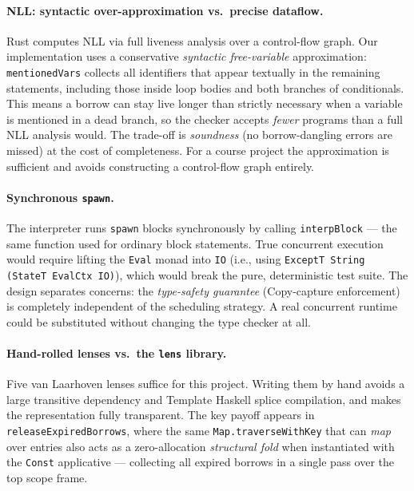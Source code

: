 \paragraph{NLL: syntactic over-approximation vs.\ precise dataflow.}
Rust computes NLL via full liveness analysis over a control-flow graph.
Our implementation uses a conservative \emph{syntactic free-variable}
approximation: \texttt{mentionedVars} collects all identifiers that appear
textually in the remaining statements, including those inside loop bodies
and both branches of conditionals.
This means a borrow can stay live longer than strictly necessary when a
variable is mentioned in a dead branch, so the checker accepts \emph{fewer}
programs than a full NLL analysis would.
The trade-off is \emph{soundness} (no borrow-dangling errors are missed) at
the cost of completeness.
For a course project the approximation is sufficient and avoids constructing
a control-flow graph entirely.

\paragraph{Synchronous \texttt{spawn}.}
The interpreter runs \texttt{spawn} blocks synchronously by calling
\texttt{interpBlock} --- the same function used for ordinary block statements.
True concurrent execution would require lifting the \texttt{Eval} monad into
\texttt{IO} (i.e., using \texttt{ExceptT String (StateT EvalCtx IO)}), which
would break the pure, deterministic test suite.
The design separates concerns: the \emph{type-safety guarantee} (Copy-capture
enforcement) is completely independent of the scheduling strategy.
A real concurrent runtime could be substituted without changing the type
checker at all.

\paragraph{Hand-rolled lenses vs.\ the \texttt{lens} library.}
Five van Laarhoven lenses suffice for this project.
Writing them by hand avoids a large transitive dependency and Template Haskell
splice compilation, and makes the representation fully transparent.
The key payoff appears in \texttt{releaseExpiredBorrows}, where the same
\texttt{Map.traverseWithKey} that can \emph{map} over entries also acts as a
zero-allocation \emph{structural fold} when instantiated with the \texttt{Const}
applicative --- collecting all expired borrows in a single pass over the
top scope frame.
